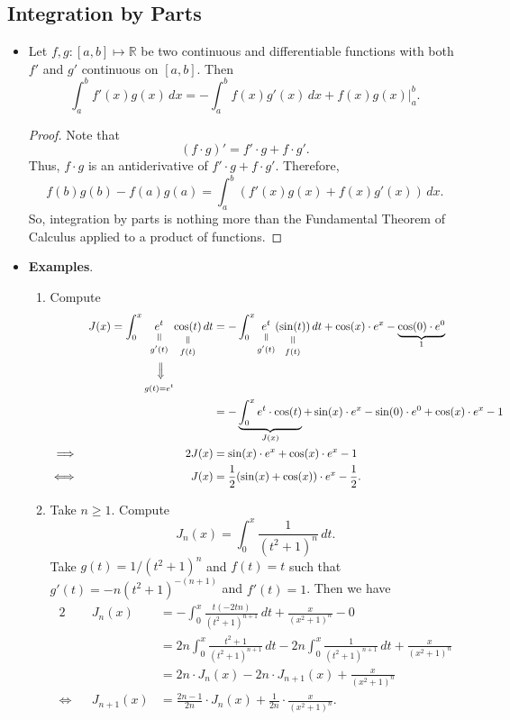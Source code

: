 \documentclass{article}
\newcommand{\R}{\mathbb{R}}
\newcommand{\verteq}{\rotatebox{90}{$\,=$}}
\newcommand{\equalto}[2]{\underset{\scriptstyle\overset{\mkern4mu\verteq}{#2}}{#1}}
\newcommand{\vertimplies}{\rotatebox{270}{$\,\implies$}}
\newcommand{\vertimply}[2]{\underset{\scriptstyle\overset{\mkern4mu\vertimplies}{#2}}{#1}}
\newcommand{\?}{\stackrel{?}{=}}
\theoremstyle{definition} %
\begin{document}
\subsection{Integration by Parts}

\begin{itemize}
    \item[]
    \begin{lemma}
        Let $f, g: [a, b] \mapsto \R$ be two continuous and differentiable functions with both $f'$ and $g'$ continuous on $[a, b]$. Then
        $$\int_a^b f'(x)g(x) \,dx = -\int_a^b f(x)g'(x) \,dx + f(x)g(x) \bigg|_a^b.$$
        \label{lemma:integration_by_parts}
    \end{lemma}
    \begin{proof}
        Note that
        $$(f \cdot g)' = f' \cdot g + f \cdot g'.$$
        Thus, $f \cdot g$ is an antiderivative of $f' \cdot g + f \cdot g'$. Therefore,
        $$f(b)g(b) - f(a)g(a) = \int_a^b\left(f'(x)g(x) + f(x)g'(x)\right) \,dx.$$
        So, integration by parts is nothing more than the Fundamental Theorem of Calculus applied to a product of functions.
    \end{proof}
    \item \textbf{Examples}.
    \begin{enumerate}
        \item Compute
        \begin{alignat*}{2}
            &&J(x) = \int_0^x \equalto{e^t}{\vertimply{g'(t)}{g(t) = e^t}} \equalto{\cos(t)}{f(t)} \,dt &= -\int_0^x \equalto{e^t}{g'(t)}\equalto{(\sin(t))}{f(t)} \,dt + \cos(x) \cdot e^x - \underbrace{\cos(0) \cdot e^0}_{1} \\
            && &= -\underbrace{\int_0^x e^t \cdot \cos(t)}_{J(x)} + \sin(x) \cdot e^x - \sin(0) \cdot e^0 + \cos(x) \cdot e^x - 1 \\
            \implies&& 2J(x) &= \sin(x) \cdot e^x + \cos(x) \cdot e^x - 1 \\
            \iff&& J(x) &= \frac{1}{2}(\sin(x) + \cos(x)) \cdot e^x - \frac{1}{2}.
        \end{alignat*}
        \item Take $n \geq 1$. Compute
        $$J_n(x) = \int_0^x \frac{1}{(t^2 + 1)^n} \,dt.$$
        Take $g(t) = 1/(t^2 + 1)^n$ and $f(t) = t$ such that $g'(t) = -n(t^2 + 1)^{-(n + 1)}$ and $f'(t) = 1$. Then we have
        \begin{alignat*}{2}
            &&J_n(x) &= -\int_0^x \frac{t(-2tn)}{(t^2 + 1)^{n + 1}} \,dt + \frac{x}{(x^2 + 1)^n} - 0 \\
            && &= 2n \int_0^x \frac{t^2 + 1}{(t^2 + 1)^{n + 1}} \,dt - 2n \int_0^x \frac{1}{(t^2 + 1)^{n + 1}} \,dt + \frac{x}{(x^2 + 1)^n} \\
            && &= 2n \cdot J_n(x) - 2n \cdot J_{n + 1}(x) + \frac{x}{(x^2 + 1)^n} \\
            \iff&& J_{n + 1}(x) &= \frac{2n - 1}{2n} \cdot J_n(x) + \frac{1}{2n} \cdot \frac{x}{(x^2 + 1)^n}.
        \end{alignat*}
    \end{enumerate}
\end{itemize}
\end{document}
